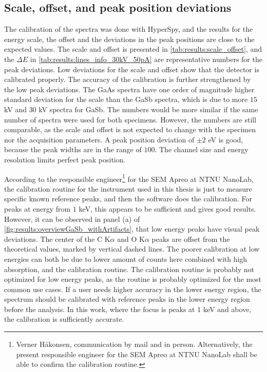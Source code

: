 \subsection{Scale, offset, and peak position deviations}
\label{discussion:scale_offset}

The calibration of the spectra was done with HyperSpy, and the results for the energy scale, the offset and the deviations in the peak positions are close to the expected values.
The scale and offset is presented in \cref{tab:results:scale_offset}, and the $\Delta E$ in \cref{tab:results:lines_info_30kV_50pA} are representative numbers for the peak deviations.
Low deviations for the scale and offset show that the detector is calibrated properly.
The accuracy of the calibration is further strengthened by the low peak deviations.
The GaAs spectra have one order of magnitude higher standard deviation for the scale than the GaSb spectra, which is due to more $15$ kV and $30$ kV spectra for GaSb.
The numbers would be more similar if the same number of spectra were used for both specimens.
However, the numbers are still comparable, as the scale and offset is not expected to change with the specimen nor the acquisition parameters.
A peak position deviation of $\pm 2$ eV is good, because the peak widths are in the range of $100$.
The channel size and energy resolution limits perfect peak position.

%
According to the responsible engineer\footnote{Verner Håkonsen, communication by mail and in person. Alternatively, the present responsible engineer for the SEM Apreo at NTNU NanoLab shall be able to confirm the calibration routine.} for the SEM Apreo at NTNU NanoLab, the calibration routine for the instrument used in this thesis is just to measure specific known reference peaks, and then the software does the calibration.
For peaks at energy from $1$ keV, this appears to be sufficient and gives good results.
However, it can be observed in panel (a) of \cref{fig:results:overviewGaSb_withArtifacts}, that low energy peaks have visual peak deviations.
The center of the C K$\alpha$ and O K$\alpha$ peaks are offset from the theoretical values, marked by vertical dashed lines.
The poorer calibration at low energies can both be due to lower amount of counts here combined with high absorption, and the calibration routine.
The calibration routine is probably not optimized for low energy peaks, as the routine is probably optimized for the most common use cases.
If a user needs higher accuracy in the lower energy region, the spectrum should be calibrated with reference peaks in the lower energy region before the analysis.
In this work, where the focus is peaks at $1$ keV and above, the calibration is sufficiently accurate.



